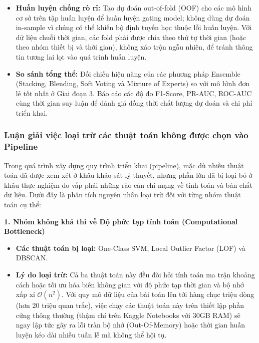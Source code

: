 \begin{enumerate}
\begin{itemize}
        \item \textbf{Huấn luyện chống rò rỉ:} Tạo dự đoán out-of-fold (OOF) cho các mô hình cơ sở trên tập huấn luyện để huấn luyện gating model; không dùng dự đoán in-sample vì chúng có thể khiến bộ định tuyến học thuộc lỗi huấn luyện. Với dữ liệu chuỗi thời gian, các fold phải được chia theo thứ tự thời gian (hoặc theo nhóm thiết bị và thời gian), không xáo trộn ngẫu nhiên, để tránh thông tin tương lai lọt vào quá trình huấn luyện.
        \item \textbf{So sánh tổng thể:} Đối chiếu hiệu năng của các phương pháp Ensemble (Stacking, Blending, Soft Voting và Mixture of Experts) so với mô hình đơn lẻ tốt nhất ở Giai đoạn 3. Báo cáo các độ đo F1-Score, PR-AUC, ROC-AUC cùng thời gian suy luận để đánh giá đồng thời chất lượng dự đoán và chi phí triển khai.
    \end{itemize}
\end{enumerate}



\subsubsection{Luận giải việc loại trừ các thuật toán không được chọn vào Pipeline}
Trong quá trình xây dựng quy trình triển khai (pipeline), mặc dù nhiều thuật toán đã được xem xét ở khâu khảo sát lý thuyết, nhưng phần lớn đã bị loại bỏ ở khâu thực nghiệm do vấp phải những rào cản chí mạng về tính toán và bản chất dữ liệu. Dưới đây là phân tích nguyên nhân loại trừ đối với từng nhóm thuật toán cụ thể:

\textbf{1. Nhóm không khả thi về Độ phức tạp tính toán (Computational Bottleneck)}
\begin{itemize}
    \item \textbf{Các thuật toán bị loại:} One-Class SVM, Local Outlier Factor (LOF) và DBSCAN.
    \item \textbf{Lý do loại trừ:} Cả ba thuật toán này đều đòi hỏi tính toán ma trận khoảng cách hoặc tối ưu hóa biên không gian với độ phức tạp thời gian và bộ nhớ xấp xỉ $\mathcal{O}(n^2)$. Với quy mô dữ liệu của bài toán lên tới hàng chục triệu dòng (hơn 20 triệu quan trắc), việc chạy các thuật toán này trên thiết lập phần cứng thông thường (thậm chí trên Kaggle Notebooks với 30GB RAM) sẽ ngay lập tức gây ra lỗi tràn bộ nhớ (Out-Of-Memory) hoặc thời gian huấn luyện kéo dài nhiều tuần lễ mà không thể hội tụ.
\end{itemize}

